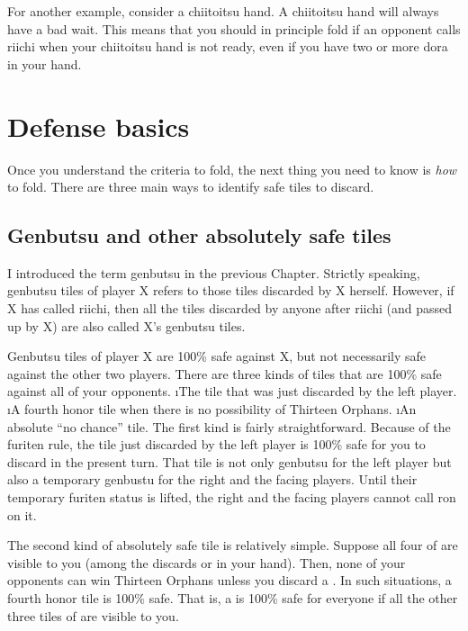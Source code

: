 \bigskip
For another example, consider a {\jap chiitoitsu} hand. A {\jap chiitoitsu} hand will always have a bad wait. This means that you should in principle fold if an opponent calls {\jap riichi} when your {\jap chiitoitsu} hand is not ready, even if you have two or more {\jap dora} in your hand.

\section{Defense basics} \label{sec:defense}

Once you understand the criteria to fold, the next thing you need to know is \emph{how} to fold. There are three main ways to identify safe tiles to discard. 

\subsection{{\jap Genbutsu} and other absolutely safe tiles}  \label{sec:genbutsu_def}
I introduced the term {\jap genbutsu} in the previous Chapter. Strictly speaking, {\jap genbutsu} tiles of player X refers to those tiles discarded by X herself. However, if X has called {\jap riichi}, then all the tiles discarded by anyone after {\jap riichi} (and passed up by X) are also called X's {\jap genbutsu} tiles. 

\bigskip
{\jap Genbutsu} tiles of player X are 100\% safe against X, but not necessarily safe against the other two players. There are three kinds of tiles that are 100\% safe against all of your opponents. 
\bi
\i The tile that was just discarded by the left player.
\i A fourth honor tile when there is no possibility of Thirteen Orphans.
\i An absolute ``no chance'' tile.
\ei
The first kind is fairly straightforward. Because of the {\jap furiten} rule, the tile just discarded by the left player is 100\% safe for you to discard in the present turn. That tile is not only {\jap genbutsu} for the left player but also a temporary {\jap genbustu} for the right and the facing players. Until their temporary {\jap furiten} status is lifted, the right and the facing players cannot call {\jap ron} on it. 

\bigskip
The second kind of absolutely safe tile is relatively simple. Suppose all four of {\large{}} are visible to you (among the discards or in your hand). Then, none of your opponents can win Thirteen Orphans unless you discard a {\large{}}. In such situations, a fourth honor tile is 100\% safe. That is, a {\large\dong} is 100\% safe for everyone if all the other three tiles of {\large\dong} are visible to you.

